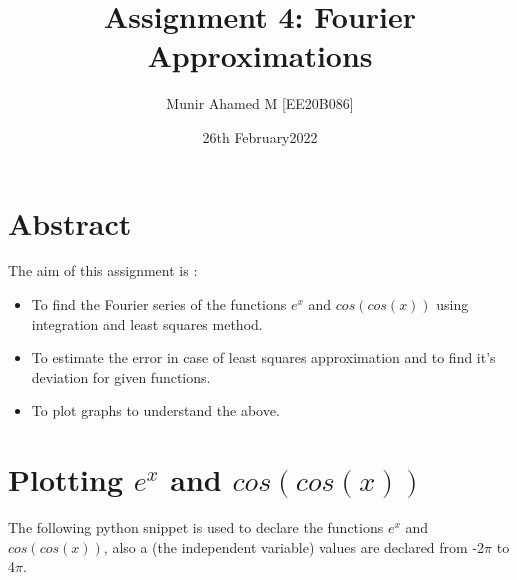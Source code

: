 \documentclass[11pt, a4paper]{article}
\title{Assignment 4: Fourier Approximations} %
\author{Munir Ahamed M [EE20B086]} %
\date{26th February2022} %
\begin{document}
	
		
\maketitle %
\section*{Abstract}
The aim of this assignment is :
\begin{itemize}
\item To find the Fourier series of the functions $e^{x}$ and $cos(cos(x))$ using integration and least squares method.
\item To estimate the error in case of least squares approximation and to find it's deviation for given functions.
\item To plot graphs to understand the above.
\end{itemize}


\section{Plotting $e^{x}$ and $cos(cos(x))$}
The following python snippet is used to declare the functions $e^{x}$ and $cos(cos(x))$, also a (the independent variable) values are declared from -2$\pi$ to 4$\pi$.
\end{document}
